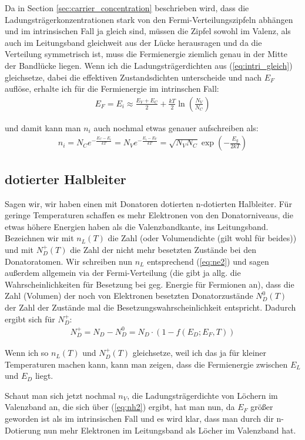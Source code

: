 \documentclass[paper=a4,10pt]{scrartcl}
\begin{document}
Da in Section \ref{sec:carrier_concentration} beschrieben wird, dass die Ladungsträgerkonzentrationen stark von den Fermi-Verteilungszipfeln abhängen und im intrinsischen Fall ja gleich sind, müssen die Zipfel sowohl im Valenz, als auch im Leitungsband gleichweit aus der Lücke herausragen und da die Verteilung symmetrisch ist, muss die Fermienergie ziemlich genau in der Mitte der Bandlücke liegen.
Wenn ich die Ladungsträgerdichten aus (\ref{eq:intri_gleich}) gleichsetze, dabei die effektiven Zustandsdichten unterscheide und nach $E_F$ auflöse, erhalte ich für die Fermienergie im intrinschen Fall:
\begin{align}
E_F = E_i \approx \frac{E_V + E_C}{2} + \frac{kT}{2} \ln \left( \frac{N_V}{N_C} \right)
\end{align} 

und damit kann man $n_i$ auch nochmal etwas genauer aufschreiben als:
\begin{align}
n_i = N_C e^{-\frac{E_C-E_i}{kT}} = N_V e^{-\frac{E_i - E_V}{kT}} = \sqrt{N_V N_C} \exp \left( - \frac{E_g}{2kT} \right)
\end{align}

\subsection{dotierter Halbleiter}
Sagen wir, wir haben einen mit Donatoren dotierten n-dotierten Halbleiter. Für geringe Temperaturen schaffen es mehr Elektronen von den Donatorniveaus, die etwas höhere Energien haben als die Valenzbandkante, ins Leitungsband. Bezeichnen wir mit $n_L(T)$ die Zahl (oder Volumendichte (gilt wohl für beides)) und mit $N^+_D(T)$ die Zahl der nicht mehr besetzten Zustände bei den Donatoratomen.
Wir schreiben nun $n_L$ entsprechend (\ref{eq:ne2}) und sagen außerdem allgemein via der Fermi-Verteilung (die gibt ja allg. die Wahrscheinlichkeiten für Besetzung bei geg. Energie für Fermionen an), dass die Zahl (Volumen) der noch von Elektronen besetzten Donatorzustände $N_D^0(T)$ der Zahl der Zustände mal die Besetzungswahrscheinlichkeit entspricht. Dadurch ergibt sich für $N^+_D$:
\begin{align}
N^+_D = N_D - N^0_D = N_D \cdot \left( 1 - f(E_D; E_F, T)\right) 
\end{align}

Wenn ich so $n_L(T)$ und $N^+_D(T)$ gleichsetze, weil ich das ja für kleiner Temperaturen machen kann, kann man zeigen, dass die Fermienergie zwischen $E_L$ und $E_D$ liegt.

Schaut man sich jetzt nochmal $n_V$, die Ladungsträgerdichte von Löchern im Valenzband an, die sich über (\ref{eq:nh2}) ergibt, hat man nun, da $E_F$ größer geworden ist als im intrinsischen Fall und es wird klar, dass man durch dir n-Dotierung nun mehr Elektronen im Leitungsband als Löcher im Valenzband hat.
\end{document}
